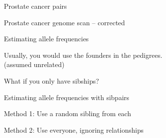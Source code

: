 \documentclass[aspectratio=169,12pt,t]{beamer}
\begin{document}
\begin{frame}[c]{Prostate cancer pairs}

\note{
}

\end{frame}



\begin{frame}[c]{Prostate cancer genome scan -- corrected}

\note{
}

\end{frame}


\begin{frame}{Estimating allele frequencies}

  \bigskip

  Usually, you would use the {\hilit founders} in the pedigrees. \\
  \qquad (assumed unrelated)

  \bigskip \bigskip

  What if you only have {\vhilit sibships}?


\note{
}

\end{frame}



\begin{frame}{Estimating allele frequencies with sibpairs}

  \bigskip

  {\hilit Method 1}: Use a random sibling from each



  \bigskip \bigskip \bigskip

  {\hilit Method 2}: Use everyone, ignoring relationships





\note{
}

\end{frame}
\end{document}
